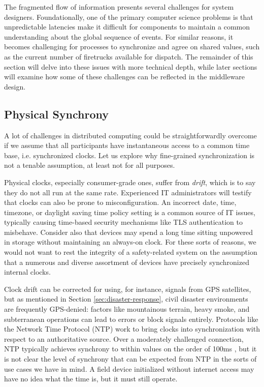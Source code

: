 \documentclass[]             %
{NASA}                       %
\theoremstyle{definition}
\begin{document}
The fragmented flow of information presents several challenges for
system designers. Foundationally, one of the primary computer science
problems is that unpredictable latencies make it difficult for
components to maintain a common understanding about the global
sequence of events. For similar reasons, it becomes challenging for
processes to synchronize and agree on shared values, such as the
current number of firetrucks available for dispatch. The remainder of
this section will delve into these issues with more technical depth,
while later sections will examine how some of these challenges can be
reflected in the middleware design.

\subsection{Physical Synchrony}
\label{ssec:physical-synchrony}
A lot of challenges in distributed computing could be
straightforwardly overcome if we assume that all participants have
instantaneous access to a common time base, i.e.  synchronized
clocks. Let us explore why fine-grained synchronization is not a
tenable assumption, at least not for all purposes.

Physical clocks, especially consumer-grade ones, suffer from
\emph{drift}, which is to say they do not all run at the same
rate. Experienced IT administrators will testify that clocks can also
be prone to misconfiguration. An incorrect date, time, timezone, or
daylight saving time policy setting is a common source of IT issues,
typically causing time-based security mechanisms like TLS
authentication \citationneeded to misbehave. Consider also that
devices may spend a long time sitting unpowered in storage without
maintaining an always-on clock. For these sorts of reasons, we would
not want to rest the integrity of a safety-related system on the
assumption that a numerous and diverse assortment of devices have
precisely synchronized internal clocks.

Clock drift can be corrected for using, for instance, signals from GPS
satellites, but as mentioned in Section \ref{sec:disaster-response},
civil disaster environments are frequently GPS-denied: factors like
mountainous terrain, heavy smoke, and subterranean operations can lead
to errors or block signals entirely. Protocols like the Network Time
Protocol (NTP) \cite{rfc1119} work to bring clocks into
synchronization with respect to an authoritative source. Over a
moderately challenged connection, NTP typically achieves synchrony to
within values on the order of 100ms \citationneeded, but it is not
clear the level of synchrony that can be expected from NTP in the
sorts of use cases we have in mind. A field device initialized without
internet access may have no idea what the time is, but it must still
operate.
\end{document}

